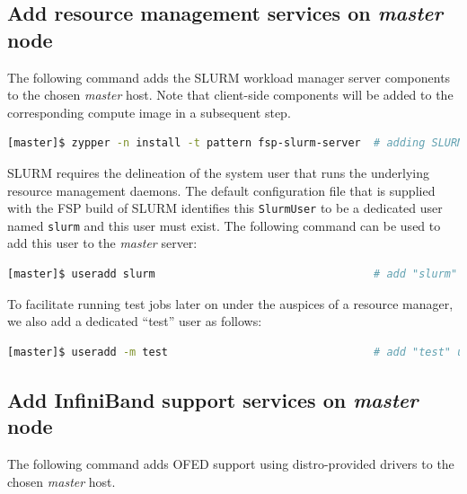 \documentclass[letterpaper]{article}
\begin{document}
\subsection{Add resource management services on {\em master} node} \label{sec:add_rm}

The following command adds the SLURM workload manager server components to the
chosen {\em master} host. Note that client-side components will be added to
the corresponding compute image in a subsequent step.

\begin{lstlisting}[language=bash,keywords={}]
[master]$ zypper -n install -t pattern fsp-slurm-server  # adding SLURM server support
\end{lstlisting}

SLURM requires the delineation of the system user that runs the underlying
resource management daemons. The default configuration file that is supplied
with the FSP build of SLURM identifies this \texttt{SlurmUser} to be a
dedicated user named \texttt{slurm} and this user must exist. 
The following command can be used to add this user to the {\em
  master} server:

\begin{lstlisting}[language=bash,keywords={}]
[master]$ useradd slurm                                  # add "slurm" user
\end{lstlisting}

To facilitate running test jobs later on under the auspices of a resource
manager, we also add a dedicated ``test'' user as follows:

\begin{lstlisting}[language=bash,keywords={}]
[master]$ useradd -m test                                # add "test" user
\end{lstlisting}

\subsection{Add InfiniBand support services on {\em master} node} \label{sec:add_ofed}

The following command adds OFED support using distro-provided drivers to the
chosen {\em master} host. 
\end{document}
